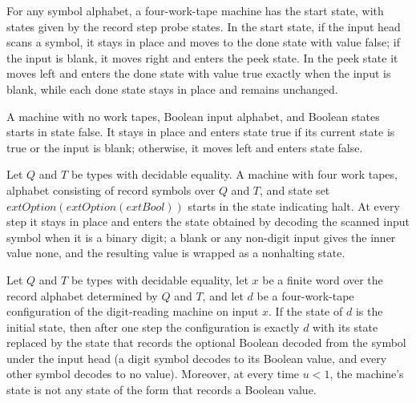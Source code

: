 \begin{definition}
\label{Turing.recordStepProbe}
\leanok
{}
For any symbol alphabet, a four-work-tape machine has the start state, with states given
by the record step probe states. In the start state, if the input head scans a symbol,
it stays in place and moves to the done state with value false; if the input is blank,
it moves right and enters the peek state. In the peek state it moves left and enters the
done state with value true exactly when the input is blank, while each done state stays
in place and remains unchanged.
\end{definition}

\begin{definition}
\label{Turing.recordStepSave}
\leanok
{}
A machine with no work tapes, Boolean input alphabet, and Boolean states starts in state
false. It stays in place and enters state true if its current state is true or the input
is blank; otherwise, it moves left and enters state false.
\end{definition}

\begin{definition}
\label{Turing.recordStepRead}
\leanok
{}
Let $Q$ and $T$ be types with decidable equality. A machine with four work tapes,
alphabet consisting of record symbols over $Q$ and $T$, and state set
$	ext{Option}(	ext{Option}(	ext{Bool}))$ starts in the state indicating halt. At every
step it stays in place and enters the state obtained by decoding the scanned input
symbol when it is a binary digit; a blank or any non-digit input gives the inner value
none, and the resulting value is wrapped as a nonhalting state.
\end{definition}

\begin{theorem}
\label{Turing.recordStep_read_run}
\leanok
{}
Let $Q$ and $T$ be types with decidable equality, let $x$ be a finite word over the
record alphabet determined by $Q$ and $T$, and let $d$ be a four-work-tape configuration
of the digit-reading machine on input $x$. If the state of $d$ is the initial state,
then after one step the configuration is exactly $d$ with its state replaced by the
state that records the optional Boolean decoded from the symbol under the input head (a
digit symbol decodes to its Boolean value, and every other symbol decodes to no value).
Moreover, at every time $u<1$, the machine's state is not any state of the form that
records a Boolean value.
\end{theorem}

